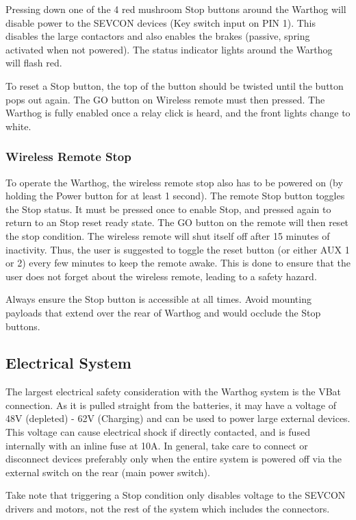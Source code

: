 \documentclass[]{clearpath-latex/clearpath-manual}
\begin{document}
Pressing down one of the 4 red mushroom Stop buttons around the Warthog will disable power to the SEVCON devices (Key switch input on PIN 1). This disables the large contactors and also enables the brakes (passive, spring activated when not powered). The status indicator lights around the Warthog will flash red.

To reset a Stop button, the top of the button should be twisted until the button pops out again. The GO button on Wireless remote must then pressed. The Warthog is fully enabled once a relay click is heard, and the front lights change to white.

\subsubsection{Wireless Remote Stop}

To operate the Warthog, the wireless remote stop also has to be powered on (by holding the Power button for at least 1 second). The remote Stop button toggles the Stop status. It must be pressed once to enable Stop, and pressed again to return to an Stop reset ready state. The GO button on the remote will then reset the stop condition. The wireless remote will shut itself off after 15 minutes of inactivity. Thus, the user is suggested to toggle the reset button (or either AUX 1 or 2) every few minutes to keep the remote awake. This is done to ensure that the user does not forget about the wireless remote, leading to a safety hazard.

Always ensure the Stop button is accessible at all times. Avoid mounting payloads that extend over the rear of Warthog and would occlude the Stop buttons.

\subsection{Electrical System}

The largest electrical safety consideration with the Warthog system is the VBat connection. As it is pulled straight from the batteries, it may have a voltage of 48V (depleted) - 62V (Charging) and can be used to power large external devices. This voltage can cause electrical shock if directly contacted, and is fused internally with an inline fuse at 10A. In general, take care to connect or disconnect devices preferably only when the entire system is powered off via the external switch on the rear (main power switch).

Take note that triggering a Stop condition only disables voltage to the SEVCON drivers and motors, not the rest of the system which includes the connectors.
\end{document}
